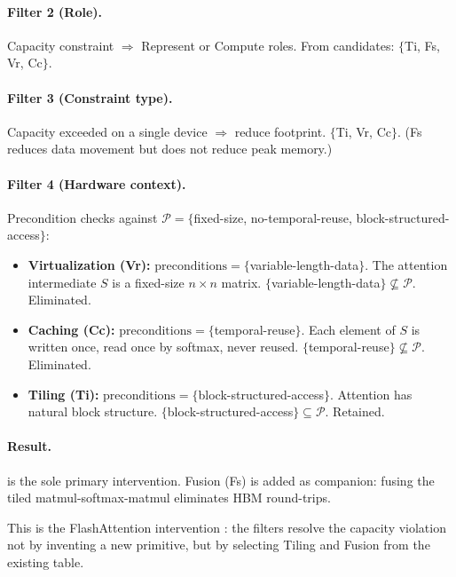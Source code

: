\documentclass[10pt,twocolumn]{article}
\begin{document}
\paragraph{Filter 2 (Role).} Capacity constraint $\Rightarrow$ Represent or Compute roles. From candidates: $\{$Ti, Fs, Vr, Cc$\}$.

\paragraph{Filter 3 (Constraint type).} Capacity exceeded on a single device $\Rightarrow$ reduce footprint. $\{$Ti, Vr, Cc$\}$. (Fs reduces data movement but does not reduce peak memory.)

\paragraph{Filter 4 (Hardware context).} Precondition checks against $\mathcal{P} = \{$fixed-size, no-temporal-reuse, block-structured-access$\}$:

\begin{itemize}[nosep]
\item \textbf{Virtualization (Vr):} $\text{preconditions} = \{$variable-length-data$\}$. The attention intermediate $S$ is a fixed-size $n \times n$ matrix. $\{$variable-length-data$\} \not\subseteq \mathcal{P}$. Eliminated.

\item \textbf{Caching (Cc):} $\text{preconditions} = \{$temporal-reuse$\}$. Each element of $S$ is written once, read once by softmax, never reused. $\{$temporal-reuse$\} \not\subseteq \mathcal{P}$. Eliminated.

\item \textbf{Tiling (Ti):} $\text{preconditions} = \{$block-structured-access$\}$. Attention has natural block structure. $\{$block-structured-access$\} \subseteq \mathcal{P}$. Retained.
\end{itemize}

\paragraph{Result.}  is the sole primary intervention. Fusion (Fs) is added as companion: fusing the tiled matmul-softmax-matmul eliminates HBM round-trips.

This is the FlashAttention intervention \citep{dao2022}: the filters resolve the capacity violation not by inventing a new primitive, but by selecting Tiling and Fusion from the existing table.
\end{document}
